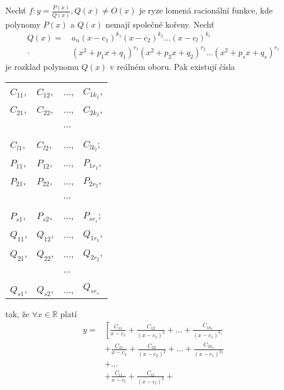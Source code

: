 \begin{veta}
    Nechť $f: y=\frac{P(x)}{Q(x)}, Q(x) \ne O(x)$ je ryze lomená
    racionální funkce, kde polynomy $P(x)$ a $Q(x)$ nemají společné
    kořeny. Nechť
    \begin{align*}
        Q(x) = & \, a_n(x-c_1)^{k_1}(x-c_2)^{k_2} \dots
        (x-c_l)^{k_l} \\
        \cdot & \, (x^2+p_1x + q_1)^{r_1}(x^2+p_2x+q_2)
        ^{r_2} \dots (x^2+p_sx+q_s)^{r_s}
    \end{align*}
    je rozklad polynomu $Q(x)$ v reálném oboru. Pak existují čísla
    \begin{center}
        \begin{tabular}{l l l l}
            $C_{11}$, & $C_{12}$, & $\dots$, & $C_{1k_1}$, \\
            $C_{21}$, & $C_{22}$, & $\dots$, & $C_{2k_2}$, \\
            \,        & \,        & $\dots$  & \,          \\
            $C_{l1}$, & $C_{l2}$, & $\dots$, & $C_{lk_l}$; \\
            $P_{11}$, & $P_{12}$, & $\dots$, & $P_{1r_1}$, \\
            $P_{21}$, & $P_{22}$, & $\dots$, & $P_{2r_2}$, \\
            \,        & \,        & $\dots$  & \,          \\
            $P_{s1}$, & $P_{s2}$, & $\dots$, & $P_{sr_s}$; \\
            $Q_{11}$, & $Q_{12}$, & $\dots$, & $Q_{1r_1}$, \\
            $Q_{21}$, & $Q_{22}$, & $\dots$, & $Q_{2r_2}$, \\
            \,        & \,        & $\dots$  & \,          \\
            $Q_{s1}$, & $Q_{s2}$, & $\dots$, & $Q_{sr_s}$
        \end{tabular}
    \end{center}
    tak, že $\forall x \in \mathbb R$ platí
    \begin{align*}
        y = & \left [
              \frac{C_{11}}{x-c_1} + \frac{C_{12}}{(x-c_1)^2} +
              \dots + \frac{C_{1k_1}}{(x-c_1)^{k_1}} \right . \\
          & + \frac{C_{21}}{x-c_2} + \frac{C_{22}}{(x-c_2)^2} +
              \dots + \frac{C_{2k_2}}{(x-c_1)^{k_2}} \\
          & + \dots \\
          & + \frac{C_{l1}}{x-c_l} + \frac{C_{l2}}{(x-c_l)^2} +

\end{align*}
\end{veta}
